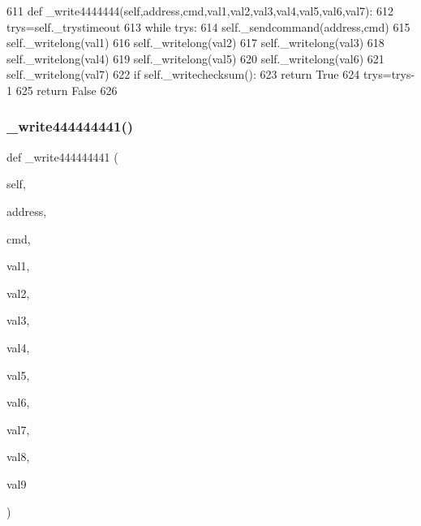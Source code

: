 \begin{DoxyCode}
611     \textcolor{keyword}{def }\_write4444444(self,address,cmd,val1,val2,val3,val4,val5,val6,val7):
612         trys=self.\_trystimeout
613         \textcolor{keywordflow}{while} trys:
614             self.\_sendcommand(address,cmd)
615             self.\_writelong(val1)
616             self.\_writelong(val2)
617             self.\_writelong(val3)
618             self.\_writelong(val4)
619             self.\_writelong(val5)
620             self.\_writelong(val6)
621             self.\_writelong(val7)
622             \textcolor{keywordflow}{if} self.\_writechecksum():
623                 \textcolor{keywordflow}{return} \textcolor{keyword}{True}
624             trys=trys-1
625         \textcolor{keywordflow}{return} \textcolor{keyword}{False}
626 
\end{DoxyCode}
\mbox{\label{classtoxic__hardware_1_1roboclaw__3_1_1Roboclaw_addae6fb16d10ba717d3863227aa9eb16}} 
\subsubsection{\texorpdfstring{\+\_\+write444444441()}{\_write444444441()}}
{\footnotesize\ttfamily def \+\_\+write444444441 (\begin{DoxyParamCaption}\item[{}]{self,  }\item[{}]{address,  }\item[{}]{cmd,  }\item[{}]{val1,  }\item[{}]{val2,  }\item[{}]{val3,  }\item[{}]{val4,  }\item[{}]{val5,  }\item[{}]{val6,  }\item[{}]{val7,  }\item[{}]{val8,  }\item[{}]{val9 }\end{DoxyParamCaption})\hspace{0.3cm}{\ttfamily [private]}}



